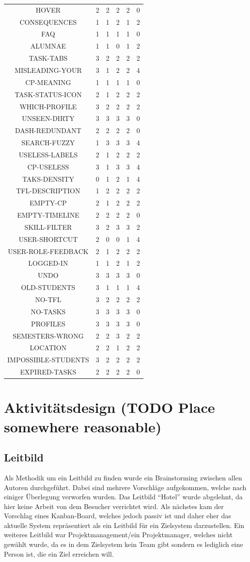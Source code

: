 \documentclass[
  12pt,
  ngerman,
  a4paper,
]{article}
\begin{document}
\begin{longtable}[]{@{}cccccc@{}}
HOVER & 2 & 2 & 2 & 2 & 0\tabularnewline
CONSEQUENCES & 1 & 1 & 2 & 1 & 2\tabularnewline
FAQ & 1 & 1 & 1 & 1 & 0\tabularnewline
ALUMNAE & 1 & 1 & 0 & 1 & 2\tabularnewline
TASK-TABS & 3 & 2 & 2 & 2 & 2\tabularnewline
MISLEADING-YOUR & 3 & 1 & 2 & 2 & 4\tabularnewline
CP-MEANING & 1 & 1 & 1 & 1 & 0\tabularnewline
TASK-STATUS-ICON & 2 & 1 & 2 & 2 & 2\tabularnewline
WHICH-PROFILE & 3 & 2 & 2 & 2 & 2\tabularnewline
UNSEEN-DIRTY & 3 & 3 & 3 & 3 & 0\tabularnewline
DASH-REDUNDANT & 2 & 2 & 2 & 2 & 0\tabularnewline
SEARCH-FUZZY & 1 & 3 & 3 & 3 & 4\tabularnewline
USELESS-LABELS & 2 & 1 & 2 & 2 & 2\tabularnewline
CP-USELESS & 3 & 1 & 3 & 3 & 4\tabularnewline
TAKS-DENSITY & 0 & 1 & 2 & 1 & 4\tabularnewline
TFL-DESCRIPTION & 1 & 2 & 2 & 2 & 2\tabularnewline
EMPTY-CP & 2 & 1 & 2 & 2 & 2\tabularnewline
EMPTY-TIMELINE & 2 & 2 & 2 & 2 & 0\tabularnewline
SKILL-FILTER & 3 & 2 & 3 & 3 & 2\tabularnewline
USER-SHORTCUT & 2 & 0 & 0 & 1 & 4\tabularnewline
USER-ROLE-FEEDBACK & 2 & 1 & 2 & 2 & 2\tabularnewline
LOGGED-IN & 1 & 1 & 2 & 1 & 2\tabularnewline
UNDO & 3 & 3 & 3 & 3 & 0\tabularnewline
OLD-STUDENTS & 3 & 1 & 1 & 1 & 4\tabularnewline
NO-TFL & 3 & 2 & 2 & 2 & 2\tabularnewline
NO-TASKS & 3 & 3 & 3 & 3 & 0\tabularnewline
PROFILES & 3 & 3 & 3 & 3 & 0\tabularnewline
SEMESTERS-WRONG & 2 & 2 & 3 & 2 & 2\tabularnewline
LOCATION & 2 & 2 & 1 & 2 & 2\tabularnewline
IMPOSSIBLE-STUDENTS & 3 & 2 & 2 & 2 & 2\tabularnewline
EXPIRED-TASKS & 2 & 2 & 2 & 2 & 0\tabularnewline
\bottomrule
\end{longtable}

\hypertarget{aktivituxe4tsdesign-todo-place-somewhere-reasonable}{%
\section{Aktivitätsdesign (TODO Place somewhere
reasonable)}\label{aktivituxe4tsdesign-todo-place-somewhere-reasonable}}

\hypertarget{leitbild}{%
\subsection{Leitbild}\label{leitbild}}

Als Methodik um ein Leitbild zu finden wurde ein Brainstorming zwischen
allen Autoren durchgeführt. Dabei sind mehrere Vorschläge aufgekommen,
welche nach einiger Überlegung verworfen wurden. Das Leitbild ``Hotel''
wurde abgelehnt, da hier keine Arbeit von dem Besucher verrichtet wird.
Als nächstes kam der Vorschlag eines Kanban-Board, welches jedoch passiv
ist und daher eher das aktuelle System repräsentiert als ein Leitbild
für ein Zielsystem darzustellen. Ein weiteres Leitbild war
Projektmanagement/ein Projektmanager, welches nicht gewählt wurde, da es
in dem Zielsystem kein Team gibt sondern es lediglich eine Person ist,
die ein Ziel erreichen will.
\end{document}
